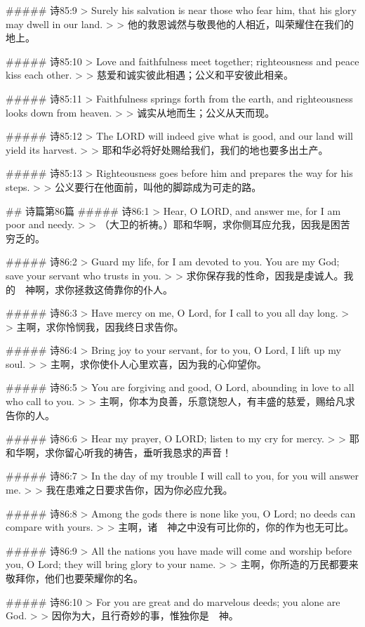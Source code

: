 ##### 诗85:9
> Surely his salvation is near those who fear him, that his glory may dwell in our land.
>
> 他的救恩诚然与敬畏他的人相近，叫荣耀住在我们的地上。


##### 诗85:10
> Love and faithfulness meet together; righteousness and peace kiss each other.
>
> 慈爱和诚实彼此相遇；公义和平安彼此相亲。


##### 诗85:11
> Faithfulness springs forth from the earth, and righteousness looks down from heaven.
>
> 诚实从地而生；公义从天而现。


##### 诗85:12
> The LORD will indeed give what is good, and our land will yield its harvest.
>
> 耶和华必将好处赐给我们，我们的地也要多出土产。


##### 诗85:13
> Righteousness goes before him and prepares the way for his steps.
>
> 公义要行在他面前，叫他的脚踪成为可走的路。


## 诗篇第86篇
##### 诗86:1
> Hear, O LORD, and answer me, for I am poor and needy.
>
> （大卫的祈祷。）耶和华啊，求你侧耳应允我，因我是困苦穷乏的。


##### 诗86:2
> Guard my life, for I am devoted to you. You are my God; save your servant who trusts in you.
>
> 求你保存我的性命，因我是虔诚人。我的　神啊，求你拯救这倚靠你的仆人。


##### 诗86:3
> Have mercy on me, O Lord, for I call to you all day long.
>
> 主啊，求你怜悯我，因我终日求告你。


##### 诗86:4
> Bring joy to your servant, for to you, O Lord, I lift up my soul.
>
> 主啊，求你使仆人心里欢喜，因为我的心仰望你。


##### 诗86:5
> You are forgiving and good, O Lord, abounding in love to all who call to you.
>
> 主啊，你本为良善，乐意饶恕人，有丰盛的慈爱，赐给凡求告你的人。


##### 诗86:6
> Hear my prayer, O LORD; listen to my cry for mercy.
>
> 耶和华啊，求你留心听我的祷告，垂听我恳求的声音！


##### 诗86:7
> In the day of my trouble I will call to you, for you will answer me.
>
> 我在患难之日要求告你，因为你必应允我。


##### 诗86:8
> Among the gods there is none like you, O Lord; no deeds can compare with yours.
>
> 主啊，诸　神之中没有可比你的，你的作为也无可比。


##### 诗86:9
> All the nations you have made will come and worship before you, O Lord; they will bring glory to your name.
>
> 主啊，你所造的万民都要来敬拜你，他们也要荣耀你的名。


##### 诗86:10
> For you are great and do marvelous deeds; you alone are God.
>
> 因你为大，且行奇妙的事，惟独你是　神。



